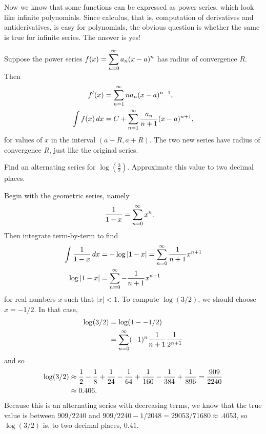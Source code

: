\nobreak
Now we know that some functions can be expressed as power series,
which look like infinite polynomials. Since calculus, that is,
computation of derivatives and antiderivatives, is easy for
polynomials, the obvious question is whether the same is true
for infinite series. The answer is yes!

\begin{theorem}\label{thm:term-by-term-calculus}
Suppose the power series $f(x)=\displaystyle\sum_{n=0}^\infty a_n(x-a)^n$ has
radius of convergence $R$. Then 
\begin{align*}
  f'(x)&=\sum_{n=1}^\infty na_n(x-a)^{n-1}, \\
  \int f(x)\,dx &= C+\sum_{n=1}^\infty {a_n\over n+1}(x-a)^{n+1}, \\
\end{align*}
for values of $x$ in the interval $(a-R,a+R)$.  The two new series
have radius of convergence $R$, just like the original series.
\end{theorem}


\begin{example}
  \label{example:formula-for-log-three-halves}
  Find an alternating series for $\log \left(\frac{3}{2}\right)$.
  Approximate this value to two decimal places.
\end{example}

\begin{solution}
Begin with the geometric series, namely
\begin{align*}
  {1\over 1-x} &= \sum_{n=0}^\infty x^n.
\end{align*}
Then integrate term-by-term to find
\begin{align*}
  \int{1\over 1-x}\,dx &= -\log|1-x| = \sum_{n=0}^\infty {1\over
    n+1}x^{n+1} \\
  \log|1-x| &= \sum_{n=0}^\infty -{1\over n+1}x^{n+1} \\
\end{align*}
for real numbers $x$ such that $|x|<1$.  To compute $\log(3/2)$, we
should choose $x = -1/2$.  In that case,
\begin{align*}
  \log(3/2)&=\log(1--1/2) \\
  &= \sum_{n=0}^\infty (-1)^n{1\over n+1}{1\over 2^{n+1}}
\end{align*}
and so
\begin{align*}
  \log(3/2) &\approx {1\over 2}-{1\over 8}+{1\over 24}-{1\over 64}
  +{1\over 160}-{1\over 384}+{1\over 896} ={909\over 2240}\\
  &\approx 0.406.
\end{align*}
Because this is an alternating series with decreasing terms,
we know that the true value is between $909/2240$ and
$909/2240-1/2048=29053/71680\approx .4053$, so $\log(3/2)$ is, to two decimal
places, $0.41$. 
\end{solution}

